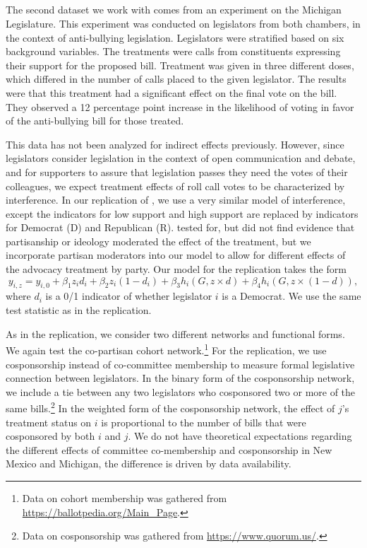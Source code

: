 \documentclass[12pt]{article}
\begin{document}
\subsection{\citet{bergan2015call}}

The second dataset we work with comes from an experiment on the Michigan Legislature. This experiment was conducted on legislators from both chambers, in the context of anti-bullying legislation. Legislators were stratified based on six background variables. The treatments were calls from constituents expressing their support for the proposed bill. Treatment was given in three different doses, which differed in the number of calls placed to the given legislator. The results were that this treatment had a significant effect on the final vote on the bill. They observed a 12 percentage point increase in the likelihood of voting in favor of the anti-bullying bill for those treated. 

This data has not been analyzed for indirect effects previously. However, since legislators consider legislation in the context of open communication and debate, and for supporters to assure that legislation passes they need the votes of their colleagues, we expect treatment effects of roll call votes to be characterized by interference. In our replication of  \citet{bergan2015call}, we use a very similar model of interference, except the indicators for low support and high support are replaced by indicators for Democrat (D) and Republican (R).   \citet{bergan2015call} tested for, but did not find evidence that partisanship or ideology moderated the effect of the treatment, but we incorporate partisan moderators into our model to allow for different effects of the advocacy treatment by party. Our model for the 
\citet{bergan2015call} replication takes the form $$y_{i,z} = y_{i,0}+\beta_1z_id_i+\beta_2z_i(1-d_i)+\beta_3h_i(G,z\times d)+\beta_4h_i(G,z\times (1-d)),$$  where $d_i$ is a 0/1 indicator of whether legislator $i$ is a Democrat. We use the same test statistic as in the \citet{butler2011can} replication.

As in the \citet{butler2011can} replication, we consider two different networks and functional forms. We again test the co-partisan cohort network.\footnote{Data on cohort membership was gathered from \url{https://ballotpedia.org/Main_Page}.} For the \citet{bergan2015call} replication, we use cosponsorship instead of co-committee membership to measure formal legislative connection between legislators. In the binary form of the cosponsorship network, we include a tie between any two legislators who cosponsored two or more of the same bills.\footnote{Data on cosponsorship was gathered from \url{https://www.quorum.us/}.} In the weighted form of the cosponsorship network, the effect of $j$'s treatment status on $i$ is proportional to the number of bills that were cosponsored by both $i$ and $j$. We do not have theoretical expectations regarding the different effects of committee co-membership and cosponsorship in New Mexico and Michigan, the difference is driven by data availability. 
\end{document}
